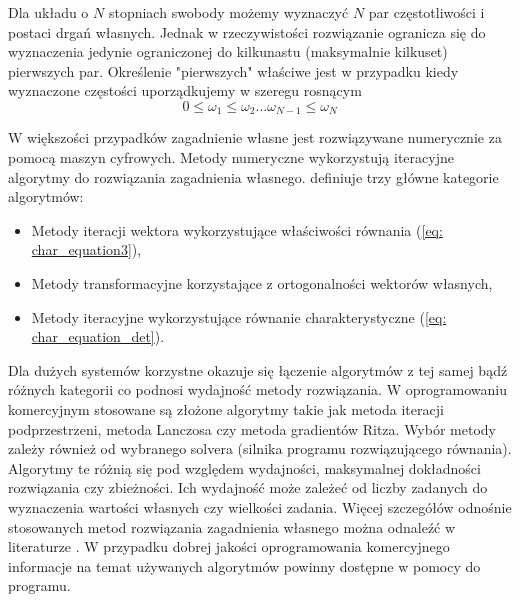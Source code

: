 Dla układu o $N$ stopniach swobody możemy wyznaczyć $N$ par częstotliwości i postaci drgań własnych. Jednak w rzeczywistości rozwiązanie ogranicza się do wyznaczenia jedynie ograniczonej do kilkunastu (maksymalnie kilkuset) pierwszych par. Określenie "pierwszych" właściwe jest w przypadku kiedy wyznaczone częstości uporządkujemy w szeregu rosnącym
\begin{equation} \label{eq: eigenvalues_list}
0 \leq \omega_1  \leq \omega_2 \dots  \omega_{N-1} \leq  \omega_N
\end{equation}

W większości przypadków zagadnienie własne jest rozwiązywane numerycznie za pomocą maszyn cyfrowych. Metody numeryczne wykorzystują iteracyjne algorytmy do rozwiązania zagadnienia własnego. \cite{Chopra2012a} definiuje trzy główne kategorie algorytmów: 
\begin{itemize}
	\item Metody iteracji wektora wykorzystujące właściwości równania (\ref{eq: char_equation3}),
	\item Metody transformacyjne korzystające z ortogonalności wektorów własnych,
	\item Metody iteracyjne wykorzystujące równanie charakterystyczne (\ref{eq: char_equation_det}).
\end{itemize}
Dla dużych systemów korzystne okazuje się łączenie algorytmów z tej samej bądź różnych kategorii co podnosi wydajność metody rozwiązania. W oprogramowaniu komercyjnym stosowane są złożone algorytmy takie jak metoda iteracji podprzestrzeni, metoda Lanczosa czy metoda gradientów Ritza. Wybór metody zależy również od wybranego solvera (silnika programu rozwiązującego równania). Algorytmy te różnią się pod względem wydajności, maksymalnej dokładności rozwiązania czy zbieżności. Ich wydajność może zależeć od liczby zadanych do wyznaczenia wartości własnych czy wielkości zadania. Więcej szczegółów odnośnie stosowanych metod rozwiązania zagadnienia własnego można odnaleźć w literaturze \parencite{Bathe2006,Wilson1983,Wilson1997,Fialko2000,Papadrakakis1993,Hughes1987,Chopra2012a}. W przypadku dobrej jakości oprogramowania komercyjnego informacje na temat używanych algorytmów powinny dostępne w pomocy do programu.

